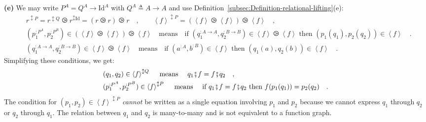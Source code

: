 \textbf{(e)} We may write $P^{A}=Q^{A}\rightarrow\text{Id}^{A}$ with
$Q^{A}\triangleq A\rightarrow A$ and use Definition~\ref{subsec:Definition-relational-lifting}(e):
\begin{align*}
 & r^{\updownarrow P}=r^{\updownarrow Q}\ogreaterthan r^{\updownarrow\text{Id}}=(r\ogreaterthan r)\ogreaterthan r\quad,\quad\quad\left<f\right>^{\updownarrow P}=(\left<f\right>\ogreaterthan\left<f\right>)\ogreaterthan\left<f\right>\quad,\\
 & (p_{1}^{:P^{A}},p_{2}^{:P^{B}})\in(\left<f\right>\ogreaterthan\left<f\right>)\ogreaterthan\left<f\right>\quad\text{means}\quad\text{if }(q_{1}^{:A\rightarrow A},q_{2}^{:B\rightarrow B})\in\left<f\right>\ogreaterthan\left<f\right>\text{ then }(p_{1}(q_{1}),p_{2}(q_{2}))\in\left<f\right>\quad.\\
 & (q_{1}^{:A\rightarrow A},q_{2}^{:B\rightarrow B})\in\left<f\right>\ogreaterthan\left<f\right>\quad\text{means}\quad\text{if }(a^{:A},b^{:B})\in\left<f\right>\text{ then }(q_{1}(a),q_{2}(b))\in\left<f\right>\quad.
\end{align*}
Simplifying these conditions, we get:
\begin{align}
 & (q_{1},q_{2})\in\left<f\right>^{\updownarrow Q}\quad\text{ means }\quad q_{1}\bef f=f\bef q_{2}\quad,\nonumber \\
 & (p_{1}^{:P^{A}},p_{2}^{:P^{B}})\in\left<f\right>^{\updownarrow P}\quad\text{ means }\quad\text{if }q_{1}\bef f=f\bef q_{2}\text{ then }f(p_{1}(q_{1}))=p_{2}(q_{2})\quad.\label{eq:relational-lifting-example-e-derivation1}
\end{align}
The condition for $(p_{1},p_{2})\in\left<f\right>^{\updownarrow P}$
\emph{cannot} be written as a single equation involving $p_{1}$ and
$p_{2}$ because we cannot express $q_{1}$ through $q_{2}$ or $q_{2}$
through $q_{1}$. The relation between $q_{1}$ and $q_{2}$ is many-to-many
and is not equivalent to a function graph.

